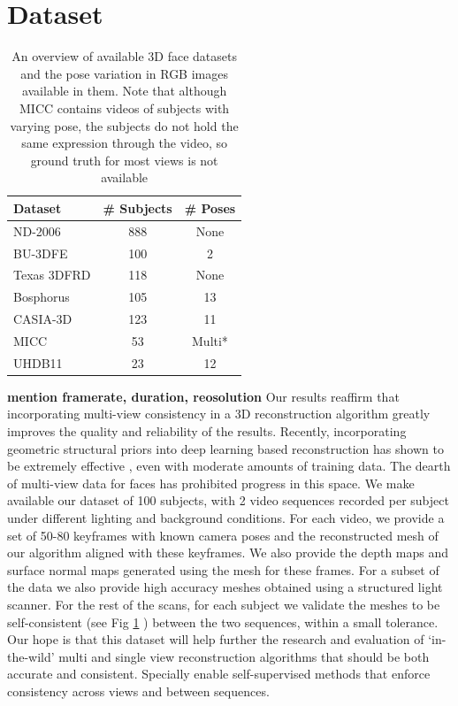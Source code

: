 \documentclass[10pt,twocolumn,letterpaper]{article}
\begin{document}
\section{Dataset}
\begin{table}
\begin{center}
\begin{tabular}{|l|c| c|}
\hline
Dataset & \# Subjects & \# Poses \\
\hline\hline
ND-2006 & 888 & None \\
BU-3DFE & 100 & 2 \\
Texas 3DFRD & 118 & None\\
Bosphorus & 105 & 13\\
CASIA-3D & 123 & 11\\
MICC & 53 & Multi*\\
UHDB11 & 23 & 12\\
\hline
\end{tabular}
\end{center}
\caption{An overview of available 3D face datasets and the pose variation in RGB images available in them. Note that although MICC contains videos of subjects with varying pose, the subjects do not hold the same expression through the video, so ground truth for most views is not available}
\end{table}
\textbf{mention framerate, duration, reosolution}
Our results reaffirm that incorporating multi-view consistency in a 3D reconstruction algorithm greatly improves the quality and reliability of the results. Recently, incorporating geometric structural priors into deep learning based reconstruction has shown to be extremely effective \cite{yao2018mvsnet}, even with moderate amounts of training data. The dearth of multi-view data for faces has prohibited progress in this space. We make available our dataset of 100 subjects, with 2 video sequences recorded per subject under different lighting and background conditions. For each video, we provide a set of 50-80 keyframes with known camera poses and the reconstructed mesh of our algorithm aligned with these keyframes. We also provide the depth maps and surface normal maps generated using the mesh for these frames. For a subset of the data we also provide high accuracy meshes obtained using a structured light scanner. For the rest of the scans, for each subject we validate the meshes to be self-consistent (see Fig \ref{} ) between the two sequences, within a small tolerance.
Our hope is that this dataset will help further the research and evaluation of `in-the-wild' multi and single view reconstruction algorithms that should be both accurate and consistent. Specially enable self-supervised methods that enforce consistency across views and between sequences.
\end{document}
